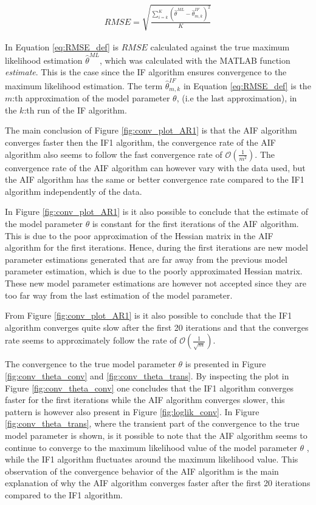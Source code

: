 \documentclass[twoside,openright]{report}
\begin{document}
\begin{align}
    RMSE = \sqrt{  \frac{ \sum_{i=k}^{K} ( \hat{\theta}^{ML} - \hat{\theta}^{IF}_{m,k})^2 }{ K } }
    \label{eq:RMSE_def}
\end{align}

In  Equation \ref{eq:RMSE_def} is $RMSE$ calculated against the true maximum likelihood estimation $\hat{\theta}^{ML}$, which was calculated with the \textsc{MATLAB} function \textit{estimate}. This is the case since the IF algorithm ensures convergence to the  maximum likelihood estimation. The term $ \hat{\theta}^{IF}_{m,k}$ in Equation \ref{eq:RMSE_def} is the $m$:th approximation of the model parameter $\theta$, (i.e the last approximation), in the $k$:th run of the IF algorithm. 

The main conclusion of Figure \ref{fig:conv_plot_AR1} is that the AIF algorithm converges  faster then the IF1 algorithm, the convergence rate of the AIF algorithm also seems to follow the fast convergence rate of $\mathcal{O}(\frac{1}{m^2})$. The convergence rate of the AIF algorithm can however vary with the data used, but the AIF algorithm has the same or better convergence rate compared to the IF1 algorithm independently of the data.   

In Figure \ref{fig:conv_plot_AR1} is it also possible to conclude that the estimate of the model parameter $\theta$ is constant for the first iterations of the AIF algorithm. This is due to the poor approximation of the Hessian matrix in the AIF algorithm for the first iterations. Hence, during the first iterations are new model parameter estimations generated that are far away from the previous model parameter estimation, which is due to the poorly approximated Hessian matrix. These new model parameter estimations are however not accepted since they are too far way from the last estimation of the model parameter. %

From Figure \ref{fig:conv_plot_AR1} is it also possible to conclude that the IF1 algorithm converges quite slow after the first 20 iterations and that the converges rate seems to approximately follow the  rate of $\mathcal{O}(\frac{1}{\sqrt{m}})$. 

The convergence to the true model parameter $\theta$ is presented in Figure \ref{fig:conv_theta_conv} and \ref{fig:conv_theta_trans}. By inspecting the plot in Figure \ref{fig:conv_theta_conv} one concludes that the IF1 algorithm converges faster for the first iterations while the AIF algorithm converges slower, this pattern is however also present in Figure \ref{fig:loglik_conv}. In Figure \ref{fig:conv_theta_trans}, where the  transient part of the convergence to the true model parameter is shown, is it possible to note that the AIF algorithm seems to continue to converge to the maximum likelihood value of the model parameter $\theta$ , while the IF1 algorithm fluctuates around the maximum likelihood value. This observation of the convergence behavior of the AIF algorithm is the main explanation of why the AIF algorithm converges faster after the first 20 iterations compared to the IF1 algorithm.   
\end{document}

